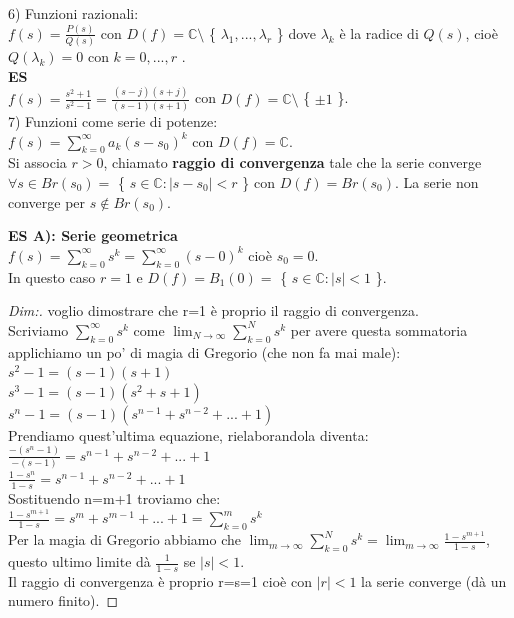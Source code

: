 6) Funzioni razionali:\\
$ f(s) = \frac{ P(s)}{Q(s)}$ con $ D(f) = \mathbb{C} \setminus$ \{ $ \lambda_{1},..., \lambda_{r}$ \} dove $ \lambda_{k}$ è la radice di $ Q(s)$, cioè $ Q( \lambda_{k})=0$ con $ k=0,...,r$ .\\

\textbf{ES}\\
$ f(s) = \frac{ s^{2}+1}{ s^{2} -1}= \frac{ (s-j)(s+j) }{ (s-1)(s+1)} $ con $ D(f) = \mathbb{C} \setminus$ \{ $ \pm 1$ \}. \\

7) Funzioni come serie di potenze:\\
$ f(s) = \sum_{k=0}^\infty a_{k} (s-s_0)^{k}$ con $ D(f)= \mathbb{C} $. \\
Si associa $r>0$, chiamato \textbf{raggio di convergenza} tale che la serie converge $ \forall s \in Br(s_0) = $ \{ $ s \in \mathbb{C} : |s-s_0| < r$ \} con $ D(f)=Br(s_0)$. La serie non converge per $ s \notin Br(s_0)$.

\pagebreak

\textbf{ES A): Serie geometrica}\\
$ f(s) = \sum_{k=0}^\infty s^{k} = \sum_{k=0}^\infty (s-0)^{k}$ cioè $s_0= 0$.\\
In questo caso $r=1$ e $ D(f)=B_1(0)=$ \{ $ s \in \mathbb{C} : |s| < 1$ \}.
\begin{proof}[Dim:] voglio dimostrare che r=1 è proprio il raggio di convergenza.\\
	Scriviamo $\sum_{k=0}^\infty s^{k} $ come $ \lim_{N \to \infty} \sum_{k=0}^N s^{k} $ per avere questa sommatoria applichiamo un po' di magia di Gregorio (che non fa mai male):\\
	
	$ s^2 -1 = (s-1)(s+1)$\\
	$ s^3 -1 = (s-1)(s^2+s+1 )$\\
	$ s^n -1 = (s-1)(s^{n-1}+ s^{n-2}+...+1)$\\
	Prendiamo quest'ultima equazione, rielaborandola diventa:\\
	$ \frac{ -(s^n -1) }{-(s-1) } = s^{n-1}+ s^{n-2}+...+1$\\
	$ \frac{ 1-s^n }{ 1-s } = s^{n-1}+ s^{n-2}+...+1$\\
	Sostituendo n=m+1 troviamo che:\\
	$ \frac{ 1-s^{m+1} }{ 1-s } = s^m+ s^{m-1}+...+1 = \sum_{k=0}^m s^{k}$\\
	Per la magia di Gregorio abbiamo che $\lim_{m \to \infty} \sum_{k=0}^N s^{k} = \lim_{m \to \infty} \frac{ 1-s^{m+1} }{ 1-s } $, questo ultimo limite dà $ \frac{1}{1-s} $ se $ |s|<1$.\\
	Il raggio di convergenza è proprio r=s=1 cioè con $ |r| < 1$ la serie converge (dà un numero finito).
	
\end{proof}


